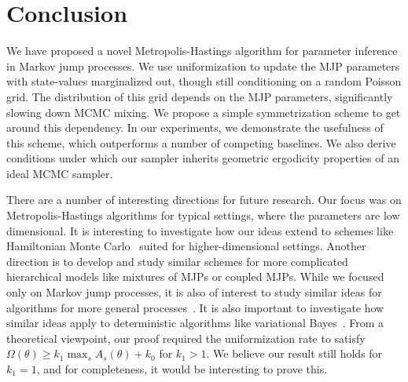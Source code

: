 \section{Conclusion}
We have proposed a novel Metropolis-Hastings algorithm for parameter 
inference in Markov jump processes. We use 
uniformization to update the MJP parameters with state-values marginalized 
out, though still conditioning on a random Poisson grid. The 
distribution of this grid depends on the MJP parameters, significantly 
slowing down MCMC mixing. We propose a simple symmetrization scheme to get 
around this dependency. In our experiments, we demonstrate the usefulness 
of this scheme, which outperforms a number of competing baselines.
We also derive conditions under which our sampler inherits geometric 
ergodicity properties of an ideal MCMC sampler.


There are a number of interesting directions for future research.
Our focus was on Metropolis-Hastings algorithms for typical settings,
where the parameters are low dimensional. It is interesting to 
investigate how our ideas extend to schemes like Hamiltonian Monte 
Carlo~\citep{Neal2010} suited for higher-dimensional settings. Another 
direction is to develop and study similar schemes for more complicated 
hierarchical models like mixtures of MJPs or coupled MJPs. While we 
focused only on Markov jump processes, it is also of interest to study 
similar ideas for algorithms for more general processes~\citep{RaoTeh12}. 
It is also important to investigate how similar ideas apply to 
deterministic algorithms like variational Bayes~\citep{OpperVarinf, panzharao17}. From 
a theoretical viewpoint, our proof required the uniformization rate to 
satisfy $\Omega(\theta) \ge k_1 \max_s A_s(\theta) + k_0$ for $k_1 > 1$. 
We believe our result still holds for $k_1 = 1$, and for completeness, 
it would be interesting to prove this.  
